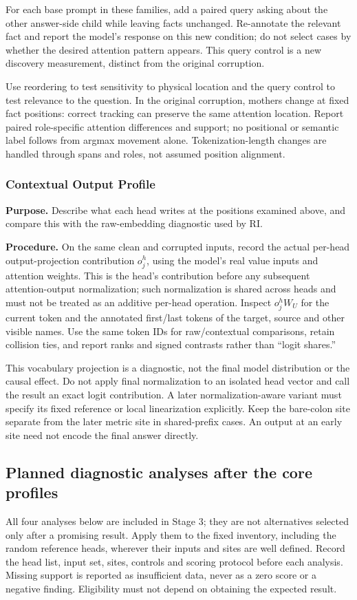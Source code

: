 \documentclass[11pt,a4paper]{article}
\begin{document}
For each base prompt in these families, add a paired query asking about the other
answer-side child while leaving facts unchanged. Re-annotate the relevant fact
and report the model's response on this new condition; do not select cases by
whether the desired attention pattern appears. This query control is a new
discovery measurement, distinct from the original corruption.

Use reordering to test sensitivity to physical location and the query control to
test relevance to the question. In the original corruption, mothers change at
fixed fact positions: correct tracking can preserve the same attention location.
Report paired role-specific attention differences and support; no positional or
semantic label follows from argmax movement alone. Tokenization-length changes
are handled through spans and roles, not assumed position alignment.

\subsubsection*{Contextual Output Profile}
\textbf{Purpose.} Describe what each head writes at the positions examined above,
and compare this with the raw-embedding diagnostic used by RI.

\textbf{Procedure.} On the same clean and corrupted inputs, record the actual
per-head output-projection contribution $o_j^h$, using the model's real value
inputs and attention weights. This is the head's contribution before any
subsequent attention-output normalization; such normalization is shared across
heads and must not be treated as an additive per-head operation.
Inspect $o_j^hW_U$ for the current token and the
annotated first/last tokens of the target, source and other visible names. Use
the same token IDs for raw/contextual comparisons, retain collision ties, and
report ranks and signed contrasts rather than ``logit shares.''

This vocabulary projection is a diagnostic, not the final model distribution or
the causal effect. Do not apply final normalization to an isolated head vector
and call the result an exact logit contribution. A later normalization-aware
variant must specify its fixed reference or local linearization explicitly.
Keep the bare-colon site separate from the later metric site in shared-prefix
cases. An output at an early site need not encode the final answer directly.

\subsection{Planned diagnostic analyses after the core profiles}
All four analyses below are included in Stage 3; they are not alternatives selected
only after a promising result. Apply them to the fixed inventory, including the
random reference heads, wherever their inputs and sites are well defined.
Record the head list, input set, sites, controls and scoring protocol before each
analysis. Missing support is reported as insufficient data, never as a zero score
or a negative finding. Eligibility must not depend on obtaining the expected result.
\end{document}
